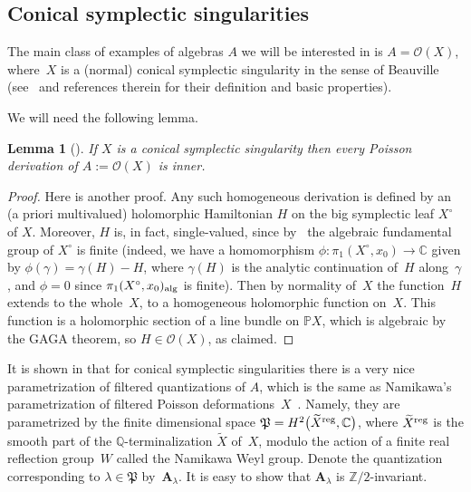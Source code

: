\documentclass[pdftex]{sigma}
\numberwithin{equation}{section}
\newtheorem{Lemma}[Theorem]{Lemma}
\begin{document}
\subsection{Conical symplectic singularities}

The main class of examples of algebras $A$ we will be interested in is $A={\mathcal O}(X)$, where~$X$ is a (normal) conical symplectic singularity in the sense of Beauville (see~\cite{Ka, L2} and references therein for their definition and basic properties).

We will need the following lemma.

\begin{Lemma}[{\cite[Proposition~2.5]{L2}}]\label{inn} If $X$ is a conical symplectic singularity then every Poisson derivation of $A:=\mathcal{O}(X)$ is inner.
\end{Lemma}

\begin{proof} Here is another proof. Any such homogeneous derivation is defined by an (a priori multivalued) holomorphic Hamiltonian $H$ on the big symplectic leaf $X^\circ$ of $X$. Moreover, $H$ is, in fact, single-valued, since by~\cite{Na1} the algebraic fundamental group of $X^\circ$ is finite (indeed, we have a homomorphism $\phi\colon \pi_1(X^\circ,x_0)\to {\mathbb C}$ given by $\phi(\gamma)=\gamma(H)-H$, where $\gamma(H)$ is the analytic continuation of~$H$ along~$\gamma$, and $\phi=0$ since $\pi_1(X^\circ,x_0)_{\rm alg}$ is finite). Then by normality of~$X$ the function~$H$ extends to the whole~$X$, to a homogeneous holomorphic function on~$X$. This function is a holomorphic section of a line bundle on ${\mathbb P}X$, which is algebraic by the GAGA theorem, so $H\in \mathcal{O}(X)$, as claimed.
\end{proof}

It is shown in \cite{L2} that for conical symplectic singularities there is a very nice parametrization of filtered quantizations of $A$, which is the same as Namikawa's parametrization of filtered Poisson deformations~$X$~\cite{Na3}. Namely, they are parametrized by the finite dimensional space $\mathfrak{P}=H^2\big(\widetilde X^{\rm reg},{\mathbb C}\big)$, where $\widetilde X^{\rm reg}$ is the smooth part of the ${\mathbb Q}$-terminalization $\widetilde X$ of~$X$, modulo the action of a finite real reflection group~$W$ called the Namikawa Weyl group. Denote the quantization corresponding to $\lambda\in \mathfrak{P}$ by~${\mathbf A}_\lambda$. It is easy to show that ${\mathbf A}_\lambda$ is ${\mathbb Z}/2$-invariant.
\end{document}
